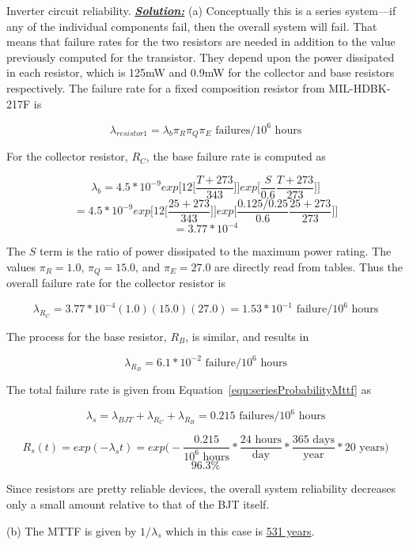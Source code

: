 {\begin{example}{Inverter circuit reliability.}
\noindent\emph{\textbf{\ul{Solution:}}}
(a) Conceptually this is a series system---if any of the individual
components fail, then the overall system will fail. That means that
failure rates for the two resistors are needed in addition to the value
previously computed for the transistor. They depend upon the power
dissipated in each resistor, which is 125mW and 0.9mW for the collector
and base resistors respectively. The failure rate for a fixed
composition resistor from MIL-HDBK-217F is

$$\lambda_{resistor1} = \lambda_b \pi_R \pi_Q \pi_E \text{ failures}/10^6 \text{ hours}$$

For the collector resistor, $R_C$, the base failure rate is
computed as

$$ \lambda_b = 4.5*10^{-9} exp \big[ 12 \big[\frac{T+273}{343} \big] \big] exp\big[ \frac{S}{0.6} \frac{T+273}{273}\big] \big]$$
$$  = 4.5*10^{-9} exp \big[ 12 \big[\frac{25+273}{343} \big] \big] exp\big[ \frac{0.125/0.25}{0.6} \frac{25+273}{273}\big] \big]$$
$$ = 3.77*10^{-4}$$

The $S$ term is the ratio of power dissipated to the maximum power
rating. The values $\pi_R=1.0$, $\pi_Q=15.0$, and $\pi_E = 27.0$ 
are directly read from tables.
Thus the overall failure rate for the collector resistor is

$$\lambda_{R_C} = 3.77*10^{-4}(1.0)(15.0)(27.0) = 1.53*10^{-1} \text{ failure}/10^6 \text{ hours}$$

The process for the base resistor, $R_B$, is similar, and results in

$$\lambda_{R_B} = 6.1*10^{-2} \text{ failure}/10^6 \text{ hours}$$

The total failure rate is given from Equation~\ref{equ:seriesProbabilityMttf} as

$$\lambda_s = \lambda_{BJT} + \lambda_{R_C} + \lambda_{R_B} = 0.215 \text{ failures}/10^6 \text{ hours}$$

$$R_s(t) =exp(-\lambda_s t) = exp \big( -\frac{0.215}{10^6 \text{ hours}} * \frac{24 \text{ hours} } {\text{day}} * \frac{365 \text{ days}}{\text{year}} * 20 \text{ years} \big)$$
$$96.3 \%$$

Since resistors are pretty reliable devices, the overall system
reliability decreases only a small amount relative to that of the BJT
itself.

(b) The MTTF is given by $1/\lambda_s$ which in this case is \ul{531 years}.
\end{example}



}
